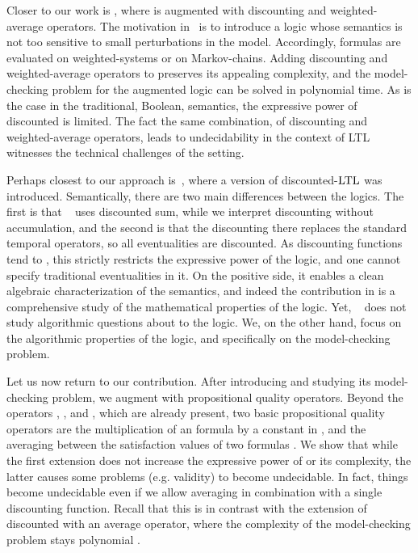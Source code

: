\documentclass{llncs}
\newcommand{\LTL}{{\ensuremath{\rm LTL}}\xspace}
\begin{document}
Closer to our work is \cite{AFHMS05}, where  is augmented with discounting and weighted-average operators.  The motivation in~\cite{AFHMS05} is to introduce a logic whose semantics is not too sensitive to small perturbations in the model. Accordingly, formulas are evaluated on weighted-systems or on Markov-chains. Adding discounting and weighted-average operators to  preserves its appealing complexity, and the model-checking problem for the augmented logic can be solved in polynomial time. As is the case in the traditional, Boolean, semantics, the expressive power of discounted  is limited.
The fact the same combination, of discounting and weighted-average operators, leads to undecidability in the context of LTL witnesses the technical challenges of the  setting.  

Perhaps closest to our approach is~\cite{Man12}, where a version of discounted-\LTL was introduced. Semantically, there are two main differences between the logics. The first is that ~\cite{Man12} uses discounted sum, while we interpret discounting without accumulation, and the second is that the discounting there replaces the standard temporal operators, so all  eventualities are discounted. As discounting functions tend to , this strictly restricts the expressive power of the logic, and one cannot specify traditional eventualities in it. On the positive side, it enables a clean algebraic characterization of the semantics, and indeed the contribution in \cite{Man12} is a comprehensive study of the mathematical properties of the logic. Yet, ~\cite{Man12} does not study algorithmic questions
about to the logic. We, on the other hand, focus on the algorithmic properties of the logic, and specifically on the model-checking problem.

Let us now return to our contribution. After introducing  and studying its model-checking problem, we augment  with propositional quality operators. Beyond the operators , , and , which are already present, two basic propositional quality operators are the multiplication of an  formula by a constant in , and the averaging between the satisfaction values of two  formulas \cite{ABK13}. We show that while the first extension does not increase the expressive power of  or its complexity, the latter causes 
some problems (e.g. validity) to become undecidable. In fact, things become undecidable even if we allow averaging in combination with a single discounting function. Recall that this is in contrast with the extension of discounted  with an average operator, where the complexity of the model-checking problem stays polynomial \cite{AFHMS05}.
\end{document}
